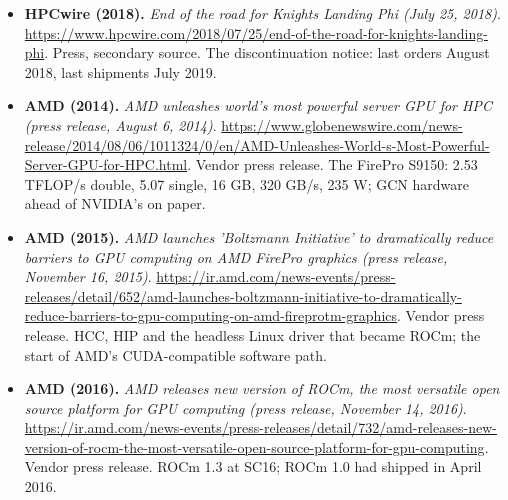 \begin{itemize}[leftmargin=1.2em,itemsep=3pt]
\item \textbf{HPCwire (2018).} \textit{End of the road for Knights Landing Phi (July 25, 2018)}. \url{https://www.hpcwire.com/2018/07/25/end-of-the-road-for-knights-landing-phi}. Press, secondary source. The discontinuation notice: last orders August 2018, last shipments July 2019.
\item \textbf{AMD (2014).} \textit{AMD unleashes world's most powerful server GPU for HPC (press release, August 6, 2014)}. \url{https://www.globenewswire.com/news-release/2014/08/06/1011324/0/en/AMD-Unleashes-World-s-Most-Powerful-Server-GPU-for-HPC.html}. Vendor press release. The FirePro S9150: 2.53 TFLOP/s double, 5.07 single, 16 GB, 320 GB/s, 235 W; GCN hardware ahead of NVIDIA's on paper.
\item \textbf{AMD (2015).} \textit{AMD launches 'Boltzmann Initiative' to dramatically reduce barriers to GPU computing on AMD FirePro graphics (press release, November 16, 2015)}. \url{https://ir.amd.com/news-events/press-releases/detail/652/amd-launches-boltzmann-initiative-to-dramatically-reduce-barriers-to-gpu-computing-on-amd-fireprotm-graphics}. Vendor press release. HCC, HIP and the headless Linux driver that became ROCm; the start of AMD's CUDA-compatible software path.
\item \textbf{AMD (2016).} \textit{AMD releases new version of ROCm, the most versatile open source platform for GPU computing (press release, November 14, 2016)}. \url{https://ir.amd.com/news-events/press-releases/detail/732/amd-releases-new-version-of-rocm-the-most-versatile-open-source-platform-for-gpu-computing}. Vendor press release. ROCm 1.3 at SC16; ROCm 1.0 had shipped in April 2016.
\end{itemize}
